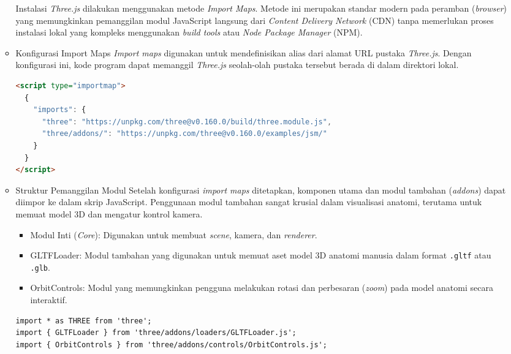 \documentclass[a4paper,twoside]{article}
\begin{document}
\begin{enumerate}
\begin{itemize}
                    Instalasi \textit{Three.js} dilakukan menggunakan metode \textit{Import Maps}. Metode ini merupakan standar modern pada peramban (\textit{browser}) yang memungkinkan pemanggilan modul JavaScript langsung dari \textit{Content Delivery Network} (CDN) tanpa memerlukan proses instalasi lokal yang kompleks menggunakan \textit{build tools} atau \textit{Node Package Manager} (NPM).
                    
                 \item{Konfigurasi Import Maps}
                    \textit{Import maps} digunakan untuk mendefinisikan alias dari alamat URL pustaka \textit{Three.js}. Dengan konfigurasi ini, kode program dapat memanggil \textit{Three.js} seolah-olah pustaka tersebut berada di dalam direktori lokal. 
            
            
                    \begin{lstlisting}[language=HTML, caption={Konfigurasi Import Maps Three.js}, xleftmargin=0pt]
<script type="importmap">
  {
    "imports": {
      "three": "https://unpkg.com/three@v0.160.0/build/three.module.js",
      "three/addons/": "https://unpkg.com/three@v0.160.0/examples/jsm/"
    }
  }
</script>
                    \end{lstlisting}
                    
            
                \item{Struktur Pemanggilan Modul}
                    Setelah konfigurasi \textit{import maps} ditetapkan, komponen utama dan modul tambahan (\textit{addons}) dapat diimpor ke dalam skrip JavaScript. Penggunaan modul tambahan sangat krusial dalam visualisasi anatomi, terutama untuk memuat model 3D dan mengatur kontrol kamera.
                    \begin{itemize}
                        \item Modul Inti (\textit{Core}): Digunakan untuk membuat \textit{scene}, kamera, dan \textit{renderer}.
                        \item GLTFLoader: Modul tambahan yang digunakan untuk memuat aset model 3D anatomi manusia dalam format \texttt{.gltf} atau \texttt{.glb}.
                        \item OrbitControls: Modul yang memungkinkan pengguna melakukan rotasi dan perbesaran (\textit{zoom}) pada model anatomi secara interaktif.
                    \end{itemize}
                    
                    \begin{lstlisting}[language=HTML, caption={Pemanggilan Modul Three.js}]
import * as THREE from 'three';
import { GLTFLoader } from 'three/addons/loaders/GLTFLoader.js';
import { OrbitControls } from 'three/addons/controls/OrbitControls.js';
                    \end{lstlisting}
                    

\end{itemize}
\end{enumerate}
\end{document}
